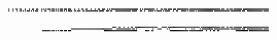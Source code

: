 \documentclass[10pt]{article}
\theoremstyle{plain}
\theoremstyle{definition}
\begin{document}
\begin{table*}[b]
{\begin{minipage}{5.32in}
\[\begin{array}{@{}r@{}}
\begin{array}{@{}l@{}}
\a\a\a\b\a\a\a\b\a\a\b\b\a\a\b\b\a\a\a\b\a\a\a\b\a\a\b\b\a\a\b\b\a\a\a\b \a\b\a\b\a\b\b\b\a\b\b\b\a\b\a\b\a\b\b\b\a\b\b\b\a\b\b\b\a\a\a\b\a\a\a\b \a\a\b\b\a\a\b\b\a\a\a\b\a\a\a\b\a\a\b\b\a\a\b\b\b\a\a\b\a\b\a\b\b\b\b\b \b\b\b\b\b\b\b\b\b\b\b\b\b\b\b\b\b\b\b\b\b\a\a\b\a\b\a\b\b\b\b\b\b\b\b\b \b\a\a\b\a\a\a\b\b\a\b\b\b\a\b\b\b\b\a\b\b\b\a\b\b\b\b\b\b\b\b\b\b\b\a\b \b\b\b\b\b\b\b\b\b\b\b\b\b\b\b\b\b\b\b\b\b\b\b\b\b\b\b\b\b\a\b\b\b\a\a\b \b\a\b\b\b\a\b\b\b\b\b\b\b\b\a\b\b\b\b\b\b\b\b\b\b\b\b\b\b\b\b\b\b\b\b\b \b\b\b\b\mynl
\a\a\a\b\a\a\a\b\a\a\a\b\a\a\b\b\a\b\a\b\a\b\b\b\a\b\a\b\a\b\b\b\a\a\a\b \a\a\b\b\a\a\a\b\a\b\b\b\a\b\a\b\a\b\b\b\a\b\a\b\a\b\b\b\b\a\a\b\b\a\b\b \b\a\a\b\b\a\b\b\b\b\b\b\b\b\b\b\b\b\a\b\b\b\b\b\a\a\b\b\b\a\b\b\a\a\a\b \b\b\b\b\b\b\b\b\b\b\b\b\b\b\a\b\b\b\b\b\a\a\a\b\b\a\a\b\a\a\a\b\b\b\b\b \a\b\a\b\b\b\b\b\a\b\a\b\b\b\b\b\a\a\a\b\a\a\b\b\a\a\a\b\b\b\b\b\a\b\a\b \b\b\b\b\a\b\a\b\b\b\b\b\b\b\b\b\b\b\b\b\b\b\a\b\b\b\b\b\b\b\b\b\b\b\b\b \b\b\a\b\b\b\b\b\b\b\b\b\b\a\b\b\b\a\a\b\b\b\b\b\b\b\b\b\b\b\b\b\b\b\a\b \b\b\b\b
\end{array}
\mynnl
\begin{array}{@{}l@{}}
\a\a\a\a\a\a\a\a\a\a\a\a\a\a\a\a\a\a\a\a\a\a\a\a\a\a\a\a\a\a\a\a\a\a\a\a \a\a\a\a\a\a\a\a\a\a\a\a\a\a\a\a\a\a\a\a\a\a\a\a\a\a\a\a\a\a\a\a\a\a\a\a \a\a\a\a\a\a\a\a\a\a\a\a\a\a\a\a\a\a\a\a\a\a\a\a\a\a\a\a\a\a\a\a\b\b\b\b \a\a\b\b\a\a\a\b\a\a\a\b\a\a\b\b\a\a\b\b\b\b\b\b\b\b\b\b\b\b\b\b\b\b\b\b \b\b\b\b\a\a\a\a\b\b\b\b\b\a\b\b\b\b\b\b\b\b\b\b\b\b\b\b\b\b\b\b\b\b\b\b \b\b\b\b\b\b\b\b\b\a\b\b\b\b\b\b\b\b\b\b\b\b\b\b\b\b\b\b\b\a\b\b\b\a\a\b \b\a\b\b\b\a\b\b\b\b\b\b\b\b\a\b\b\b\b\b\b\b\b\b\b\b\b\b\b\b\b\b\b\b\b\b \b\b\b\b\mynl
\a\a\a\a\a\a\a\a\a\a\a\a\a\a\a\a\a\a\a\a\a\a\a\a\a\a\a\a\a\a\a\a\a\a\a\a \a\a\a\a\a\a\a\a\a\a\a\a\a\a\a\a\a\a\a\a\a\a\a\a\a\a\a\a\b\b\b\b\b\b\b\b \b\b\b\b\b\b\b\b\b\b\b\b\b\b\b\b\b\b\b\b\b\b\b\b\b\b\b\b\b\b\b\b\a\a\a\a \b\b\b\b\b\b\b\b\b\b\b\b\b\b\a\b\b\b\a\b\a\a\a\a\a\a\a\a\a\a\a\a\a\a\a\b \a\a\a\a\b\b\b\b\a\a\a\a\a\b\a\b\a\a\a\a\a\a\a\a\a\a\a\a\a\a\a\b\a\a\a\a \a\b\a\b\a\a\a\a\a\b\a\b\b\b\b\b\b\b\b\b\b\b\a\b\b\b\b\b\b\b\b\b\b\b\b\b \b\b\a\b\b\b\b\b\b\b\b\b\b\a\b\b\b\a\a\b\b\b\b\b\b\b\b\b\b\b\b\b\b\b\a\b \b\b\b\b\mynl
\a\a\a\a\a\a\a\a\a\a\a\a\a\a\a\a\a\a\a\a\a\a\a\a\a\a\a\a\a\a\a\a\a\a\a\a \b\b\b\b\b\b\b\b\a\b\b\b\a\b\a\b\a\b\b\b\a\b\b\b\a\b\b\b\a\a\a\a\a\a\a\a \a\a\a\a\a\a\a\a\a\a\a\a\a\a\a\a\a\a\a\a\a\a\a\a\b\b\b\b\b\b\b\b\b\b\b\b \b\b\b\b\b\b\b\b\b\b\b\b\b\b\b\b\b\b\b\b\a\a\a\a\a\a\a\a\b\b\b\b\a\a\b\b \a\a\a\a\a\a\a\a\a\a\a\a\a\a\a\a\b\b\b\b\b\b\b\b\b\b\b\b\b\b\b\b\b\b\a\b \b\b\b\b\b\b\b\b\b\b\b\b\a\a\a\b\a\a\a\b\a\a\b\b\a\a\b\b\a\a\a\a\a\a\a\a \a\a\a\a\a\a\a\a\b\b\b\b\b\b\b\b\b\b\b\b\a\b\b\b\b\b\b\b\b\b\b\b\b\b\b\b \b\b\b\b\mynl

\end{array}
\end{array}\]
\end{minipage}}
\end{table*}
\end{document}
